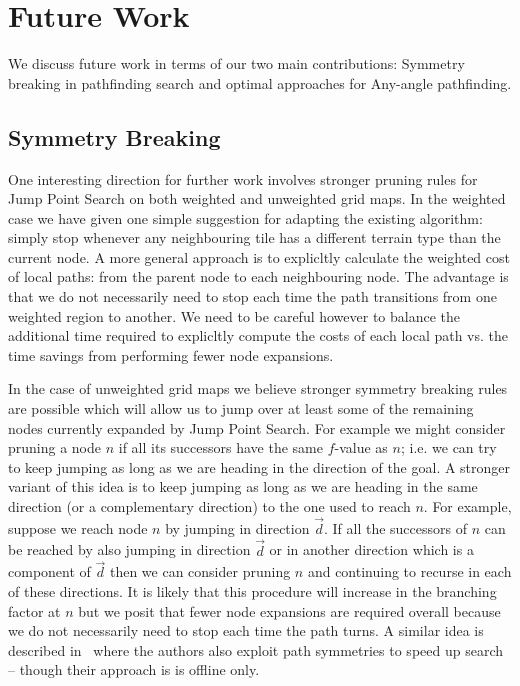 \section{Future Work}
\label{cha::conclusion::future}
We discuss future work in terms of our two main contributions: Symmetry breaking
in pathfinding search and optimal approaches for Any-angle pathfinding.

\subsection{Symmetry Breaking}
One interesting direction for further work involves stronger pruning rules
for Jump Point Search on both weighted and unweighted grid maps.
In the weighted case we have given one simple suggestion for adapting the 
existing algorithm: simply stop whenever any neighbouring tile has a different
terrain type than the current node. 
A more general approach is to explicltly calculate the 
weighted cost of local paths: from the parent node to each neighbouring node. 
The advantage is that we do not necessarily need to stop each time the path
transitions from one weighted region to another. We need to be careful however
to balance the additional time required to explicltly compute the costs of 
each local path vs. the time savings from performing fewer node expansions.

In the case of unweighted grid maps we believe stronger symmetry breaking
rules are possible which will allow us to jump over at least some of the
remaining nodes currently expanded by Jump Point Search. For example we might
consider pruning a node $n$ if all its successors have the same $f$-value as
$n$; i.e.  we can try to keep jumping as long as we are heading in the
direction of the goal.  A stronger variant of this idea is to keep jumping as
long as we are heading in the same direction (or a complementary direction) to
the one used to reach $n$. For example, suppose we reach node $n$ by jumping
in direction $\vec{d}$.  If all the successors of $n$ can be reached by also
jumping in direction $\vec{d}$ or in another direction which is a component of
$\vec{d}$ then we can consider pruning $n$ and continuing to recurse in each
of these directions. It is likely that this procedure will increase in the 
branching factor at $n$ but we posit that fewer node expansions are required 
overall because we do not necessarily need to stop each time the path turns. 
A similar idea is described in~\citep{urasKH13} where the authors also exploit
path symmetries to speed up search -- though their approach is is offline
only.

